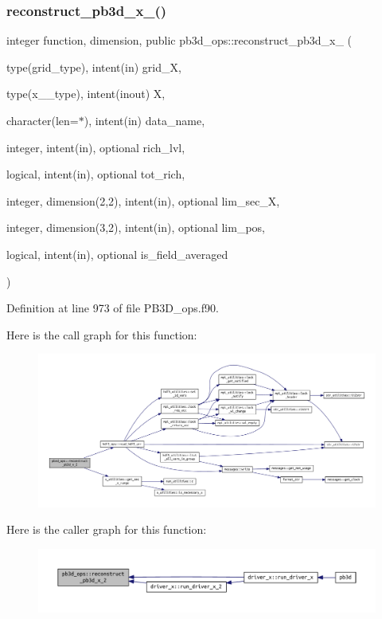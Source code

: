 \subsubsection{\texorpdfstring{reconstruct\+\_\+pb3d\+\_\+x\+\_()}{reconstruct\_pb3d\_x\_2()}}
{\footnotesize\ttfamily integer function, dimension, public pb3d\+\_\+ops\+::reconstruct\+\_\+pb3d\+\_\+x\+\_ (\begin{DoxyParamCaption}\item[{type(grid\+\_\+type), intent(in)}]{grid\+\_\+X,  }\item[{type(x\+\_\+2\+\_\+type), intent(inout)}]{X,  }\item[{character(len=$\ast$), intent(in)}]{data\+\_\+name,  }\item[{integer, intent(in), optional}]{rich\+\_\+lvl,  }\item[{logical, intent(in), optional}]{tot\+\_\+rich,  }\item[{integer, dimension(2,2), intent(in), optional}]{lim\+\_\+sec\+\_\+X,  }\item[{integer, dimension(3,2), intent(in), optional}]{lim\+\_\+pos,  }\item[{logical, intent(in), optional}]{is\+\_\+field\+\_\+averaged }\end{DoxyParamCaption})}



Definition at line 973 of file P\+B3\+D\+\_\+ops.\+f90.

Here is the call graph for this function\+:
\nopagebreak
\begin{figure}[H]
\begin{center}
\leavevmode
\includegraphics[width=350pt]{namespacepb3d__ops_a50f211992fbe20a56749b2be81a521e6_cgraph}
\end{center}
\end{figure}
Here is the caller graph for this function\+:
\nopagebreak
\begin{figure}[H]
\begin{center}
\leavevmode
\includegraphics[width=350pt]{namespacepb3d__ops_a50f211992fbe20a56749b2be81a521e6_icgraph}
\end{center}
\end{figure}
